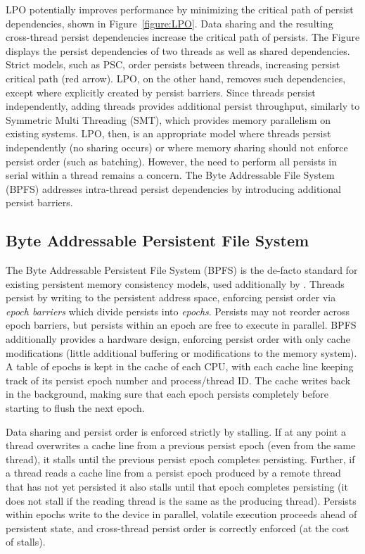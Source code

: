 
LPO potentially improves performance by minimizing the critical path of persist dependencies, shown in Figure~\ref{figure:LPO}.
Data sharing and the resulting cross-thread persist dependencies increase the critical path of persists.
The Figure displays the persist dependencies of two threads as well as shared dependencies.
Strict models, such as PSC, order persists between threads, increasing persist critical path (red arrow).
LPO, on the other hand, removes such dependencies, except where explicitly created by persist barriers.
Since threads persist independently, adding threads provides additional persist throughput, similarly to Symmetric Multi Threading (SMT), which provides memory parallelism on existing systems.
LPO, then, is an appropriate model where threads persist independently (no sharing occurs) or where memory sharing should not enforce persist order (such as batching).
However, the need to perform all persists in serial within a thread remains a concern.
The Byte Addressable File System (BPFS) addresses intra-thread persist dependencies by introducing additional persist barriers.

\subsection{Byte Addressable Persistent File System}
\label{sec:PMC:PersistenceModels:BPFS}

The Byte Addressable Persistent File System (BPFS) \cite{ConditNightingale09} is the de-facto standard for existing persistent memory consistency models, used additionally by \cite{CoburnCaulfield11, FangHsiao11, VenkataramanTolia11}.
Threads persist by writing to the persistent address space, enforcing persist order via \emph{epoch barriers} which divide persists into \emph{epochs}.
Persists may not reorder across epoch barriers, but persists within an epoch are free to execute in parallel.
BPFS additionally provides a hardware design, enforcing persist order with only cache modifications (little additional buffering or modifications to the memory system).
A table of epochs is kept in the cache of each CPU, with each cache line keeping track of its persist epoch number and process/thread ID.
The cache writes back in the background, making sure that each epoch persists completely before starting to flush the next epoch.

Data sharing and persist order is enforced strictly by stalling.
If at any point a thread overwrites a cache line from a previous persist epoch (even from the same thread), it stalls until the previous persist epoch completes persisting.
Further, if a thread reads a cache line from a persist epoch produced by a remote thread that has not yet persisted it also stalls until that epoch completes persisting (it does not stall if the reading thread is the same as the producing thread).
Persists within epochs write to the device in parallel, volatile execution proceeds ahead of persistent state, and cross-thread persist order is correctly enforced (at the cost of stalls).

